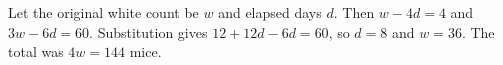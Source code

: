 Let the original white count be $w$ and elapsed days $d$. Then $w-4d=4$ and $3w-6d=60$. Substitution gives $12+12d-6d=60$, so $d=8$ and $w=36$. The total was $4w=\boxed{144}$ mice.
